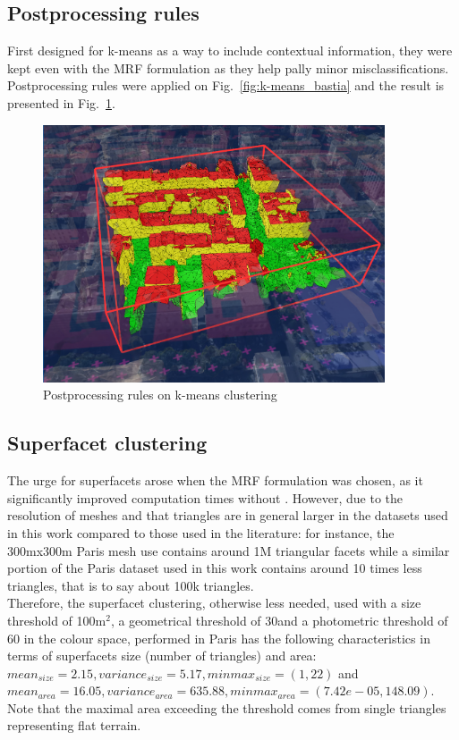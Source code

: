 \documentclass{kththesis}
\begin{document}
\subsection{Postprocessing rules}
First designed for k-means as a way to include contextual information, they were kept even with the MRF formulation as they help pally minor misclassifications. Postprocessing rules were applied on Fig.~\ref{fig:k-means_bastia} and the result is presented in Fig.~\ref{fig:bastia_postproc}.
\begin{figure}[H]
    \centering
    \includegraphics[width=0.9\textwidth]{images/Results/lod17_rouhani_additional_rules.png}
    \caption{Postprocessing rules on k-means clustering}
    \label{fig:bastia_postproc}
\end{figure}
\subsection{Superfacet clustering}
The urge for superfacets arose when the MRF formulation was chosen, as it significantly improved computation times without . However, due to the resolution of meshes and that triangles are in general larger in the datasets used in this work compared to those used in the literature: for instance, the 300mx300m  Paris mesh \textcite{rouhani} use contains around 1M triangular facets while a similar portion of the Paris dataset used in this work contains around 10 times less triangles, that is to say about 100k triangles. \\
Therefore, the superfacet clustering, otherwise less needed, used with a size threshold of 100m$^2$, a geometrical threshold of 30\degree and a photometric threshold of 60 in the colour space, performed in Paris has the following characteristics in terms of superfacets size (number of triangles) and area: $mean_{size}=2.15, variance_{size}=5.17, minmax_{size}=(1,22)$ and $mean_{area}=16.05, variance_{area}=635.88, minmax_{area}=(7.42e-05, 148.09)$. \\
Note that the maximal area exceeding the threshold comes from single triangles representing flat terrain. 
\end{document}
